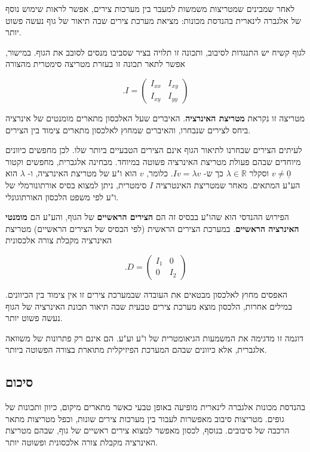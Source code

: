 \documentclass[12pt]{report}
\theoremstyle{plain}
\theoremstyle{definition}
\newcommand{\R}{\mathbb{R}}
\newcommand{\0}{\mathbf{0}}
\begin{document}
לאחר שמבינים שמטריצות משמשות למעבר בין מערכות צירים, אפשר לראות שימוש נוסף של אלגברה לינארית בהנדסת מכונות:
מציאת מערכת צירים שבה תיאור של גוף נעשה פשוט יותר.

לגוף קשיח יש התנגדות לסיבוב, ותכונה זו תלויה בציר שסביבו מנסים לסובב את הגוף.
במישור, אפשר לתאר תכונה זו בעזרת מטריצה סימטרית מהצורה

$$
.I =
\begin{pmatrix}
I_{xx} & I_{xy} \\
I_{xy} & I_{yy}
\end{pmatrix}
$$

מטריצה זו נקראת \textbf{מטריצת האינרציה}.
האיברים שעל האלכסון מתארים מומנטים של אינרציה ביחס לצירים שנבחרו, והאיברים שמחוץ לאלכסון מתארים צימוד בין הצירים.

לעיתים הצירים שבחרנו לתיאור הגוף אינם הצירים הטבעיים ביותר שלו.
לכן מחפשים כיוונים מיוחדים שבהם פעולת מטריצת האינרציה פשוטה במיוחד.
מבחינה אלגברית, מחפשים וקטור
$v\neq\underline{0}$
וסקלר
$\lambda\in\R$
כך ש-
$I v = \lambda v$.
כלומר,
$v$
הוא ו"ע של מטריצת האינרציה, ו-
$\lambda$
הוא הע"ע המתאים. מאחר שמטריצת האינטרציה
$I$
סימטרית, ניתן למצוא בסיס אורתונורמלי של ו"ע לפי משפט הלכסון האורתוגונלי.

הפירוש ההנדסי הוא שהו"ע בבסיס זה הם \textbf{הצירים הראשיים} של הגוף, והע"ע הם \textbf{מומנטי האינרציה הראשיים}.
במערכת הצירים הראשית (לפי הבסיס של הצירים הראשיים) מטריצת האינרציה מקבלת צורה אלכסונית

$$
.D =
\begin{pmatrix}
I_1 & 0 \\
0 & I_2
\end{pmatrix}
$$

האפסים מחוץ לאלכסון מבטאים את העובדה שבמערכת צירים זו אין צימוד בין הכיוונים.
במילים אחרות, הלכסון מוצא מערכת צירים טבעית שבה תיאור תכונת האינרציה של הגוף נעשה פשוט יותר.

דוגמה זו מדגימה את המשמעות הגיאומטרית של ו"ע וע"ע.
הם אינם רק פתרונות של משוואה אלגברית, אלא כיוונים שבהם המערכת הפיזיקלית מתוארת בצורה הפשוטה ביותר.

\subsection*{סיכום}

בהנדסת מכונות אלגברה לינארית מופיעה באופן טבעי כאשר מתארים מיקום, כיוון ותכונות של גופים.
מטריצות סיבוב מאפשרות לעבור בין מערכות צירים שונות, וכפל מטריצות מתאר הרכבה של סיבובים.
בנוסף, לכסון מאפשר למצוא צירים ראשיים של גוף, שבהם מטריצת האינרציה מקבלת צורה אלכסונית ופשוטה יותר.
\end{document}
